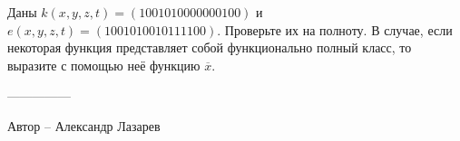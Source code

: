\question
Даны $k(x, y, z, t) = (1001010000000100)$ и $e(x, y, z, t) = (1001010010111100)$. Проверьте их на полноту. В случае, если некоторая функция представляет собой функционально полный класс, то выразите с помощью неё функцию  $\overline{x}$.

---------------

Автор -- Александр Лазарев